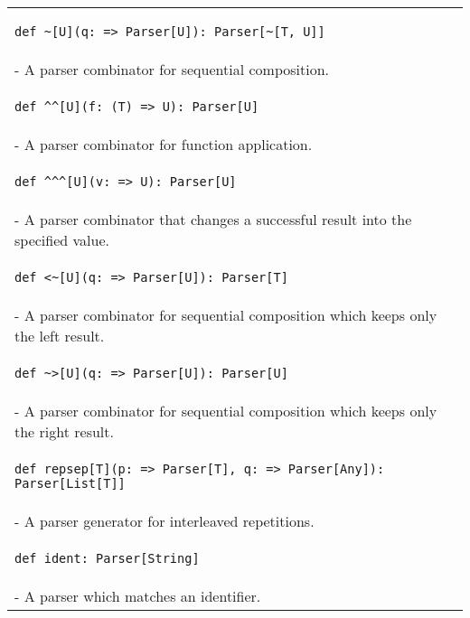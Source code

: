 \begin{table}[t]
\begin{tabular}{l}
\hline
\begin{lstlisting}
def ~[U](q: => Parser[U]): Parser[~[T, U]]
\end{lstlisting} \\
\hspace{.2in}- A parser combinator for sequential composition. \\
\hline
\begin{lstlisting}
def ^^[U](f: (T) => U): Parser[U]
\end{lstlisting} \\
\hspace{.2in}- A parser combinator for function application. \\
\hline
\begin{lstlisting}
def ^^^[U](v: => U): Parser[U]
\end{lstlisting} \\
\hspace{.2in}- A parser combinator that changes a successful result into the specified value. \\
\hline
\begin{lstlisting}
def <~[U](q: => Parser[U]): Parser[T]
\end{lstlisting} \\
\hspace{.2in}- A parser combinator for sequential composition which keeps only the left result. \\
\hline
\begin{lstlisting}
def ~>[U](q: => Parser[U]): Parser[U]
\end{lstlisting} \\
\hspace{.2in}- A parser combinator for sequential composition which keeps only the right result. \\
\hline
\begin{lstlisting}
def repsep[T](p: => Parser[T], q: => Parser[Any]): Parser[List[T]]
\end{lstlisting} \\
\hspace{.2in}- A parser generator for interleaved repetitions. \\
\hline
\begin{lstlisting}
def ident: Parser[String]
\end{lstlisting} \\
\hspace{.2in}- A parser which matches an identifier. \\

\end{tabular}
\end{table}
